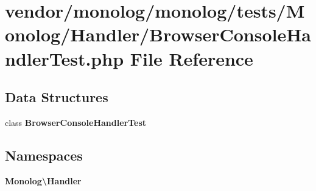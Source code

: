 \section{vendor/monolog/monolog/tests/\+Monolog/\+Handler/\+Browser\+Console\+Handler\+Test.php File Reference}
\label{_browser_console_handler_test_8php}
\subsection*{Data Structures}
\begin{DoxyCompactItemize}
\item 
class {\bf Browser\+Console\+Handler\+Test}
\end{DoxyCompactItemize}
\subsection*{Namespaces}
\begin{DoxyCompactItemize}
\item 
 {\bf Monolog\textbackslash{}\+Handler}
\end{DoxyCompactItemize}
